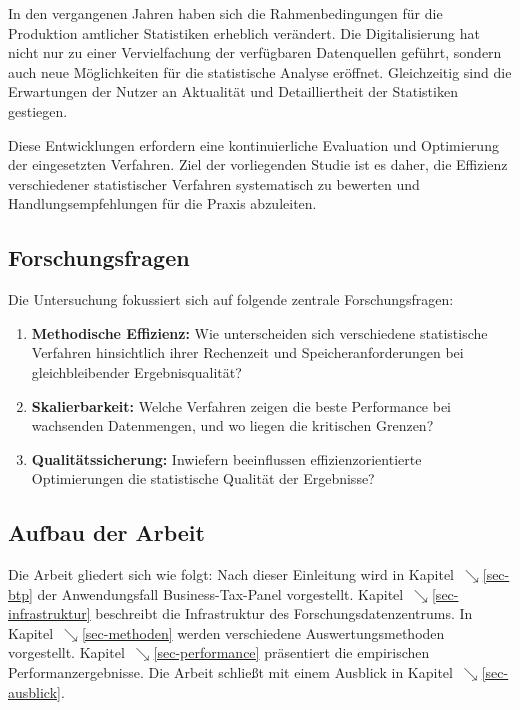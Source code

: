 \documentclass[
  ngerman,
  10pt,
  twocolumn]{article}
\let\oldref\ref
\renewcommand{\ref}[1]{{\color{wistaBlue}$\searrow$}\oldref{#1}}
\begin{document}
In den vergangenen Jahren haben sich die Rahmenbedingungen für die
Produktion amtlicher Statistiken erheblich verändert. Die
Digitalisierung hat nicht nur zu einer Vervielfachung der verfügbaren
Datenquellen geführt, sondern auch neue Möglichkeiten für die
statistische Analyse eröffnet. Gleichzeitig sind die Erwartungen der
Nutzer an Aktualität und Detailliertheit der Statistiken gestiegen.

Diese Entwicklungen erfordern eine kontinuierliche Evaluation und
Optimierung der eingesetzten Verfahren. Ziel der vorliegenden Studie ist
es daher, die Effizienz verschiedener statistischer Verfahren
systematisch zu bewerten und Handlungsempfehlungen für die Praxis
abzuleiten.

\subsection{Forschungsfragen}\label{forschungsfragen}

Die Untersuchung fokussiert sich auf folgende zentrale Forschungsfragen:

\begin{enumerate}
\def\labelenumi{\arabic{enumi}.}
\item
  \textbf{Methodische Effizienz:} Wie unterscheiden sich verschiedene
  statistische Verfahren hinsichtlich ihrer Rechenzeit und
  Speicheranforderungen bei gleichbleibender Ergebnisqualität?
\item
  \textbf{Skalierbarkeit:} Welche Verfahren zeigen die beste Performance
  bei wachsenden Datenmengen, und wo liegen die kritischen Grenzen?
\item
  \textbf{Qualitätssicherung:} Inwiefern beeinflussen
  effizienzorientierte Optimierungen die statistische Qualität der
  Ergebnisse?
\end{enumerate}

\subsection{Aufbau der Arbeit}\label{aufbau-der-arbeit}

Die Arbeit gliedert sich wie folgt: Nach dieser Einleitung wird in
Kapitel~\ref{sec-btp} der Anwendungsfall Business-Tax-Panel vorgestellt.
Kapitel~\ref{sec-infrastruktur} beschreibt die Infrastruktur des
Forschungsdatenzentrums. In Kapitel~\ref{sec-methoden} werden
verschiedene Auswertungsmethoden vorgestellt.
Kapitel~\ref{sec-performance} präsentiert die empirischen
Performanzergebnisse. Die Arbeit schließt mit einem Ausblick in
Kapitel~\ref{sec-ausblick}.
\end{document}
